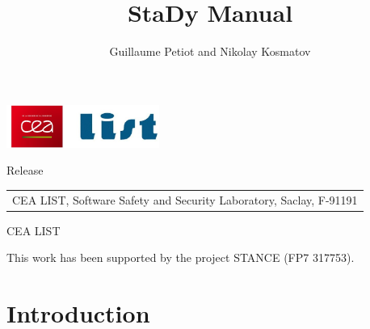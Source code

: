 \documentclass[web]{frama-c-book}
\begin{document}

\begin{titlepage}
\begin{flushleft}
\includegraphics[height=14mm]{cealistlogo.jpg}
\end{flushleft}
\vfill
\title{StaDy Manual}{Release \framacversion}
\author{Guillaume Petiot and Nikolay Kosmatov}
\begin{tabular}{l}
CEA LIST, Software Safety and Security Laboratory, Saclay, F-91191 \\
\end{tabular}
\vfill
\begin{flushleft}
   CEA LIST

This work has been supported by the project STANCE (FP7 317753).
\end{flushleft}
\end{titlepage}

\tableofcontents







\chapter{Introduction}
\end{document}
